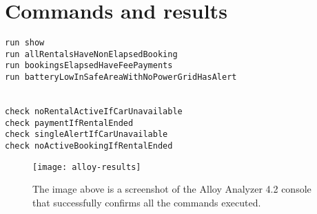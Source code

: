 \section{Commands and results}

\lstset{language=alloy}

\begin{lstlisting}
run show
run allRentalsHaveNonElapsedBooking
run bookingsElapsedHaveFeePayments
run batteryLowInSafeAreaWithNoPowerGridHasAlert


check noRentalActiveIfCarUnavailable
check paymentIfRentalEnded
check singleAlertIfCarUnavailable
check noActiveBookingIfRentalEnded
\end{lstlisting}

\begin{figure}[H]
	\centering
	\texttt{[image: alloy-results]}
	\caption[Alloy results]{The image above is a screenshot of the Alloy Analyzer 4.2 console that successfully confirms all the commands executed.}
	\label{fig:alloy-results}
\end{figure}
